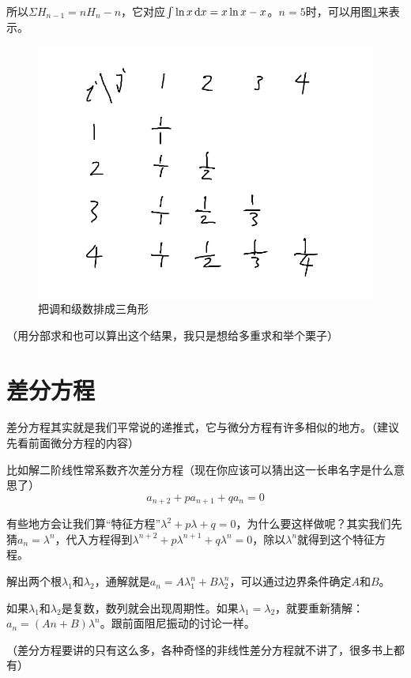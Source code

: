 所以$\Sigma H_{n-1}=n H_n-n$，它对应$\int \ln x \mathop{}\!\mathrm{d} x=x \ln x-x$。$n=5$时，可以用图\ref{fig-triangle-harmonic}来表示。
\begin{figure}[htb]
\centering
\includegraphics[scale=0.5]{fig/triangle-harmonic}
\caption{把调和级数排成三角形}
\label{fig-triangle-harmonic}
\end{figure}

（用分部求和也可以算出这个结果，我只是想给多重求和举个栗子）
\section{差分方程}
差分方程其实就是我们平常说的递推式，它与微分方程有许多相似的地方。（建议先看前面微分方程的内容）

比如解二阶线性常系数齐次差分方程（现在你应该可以猜出这一长串名字是什么意思了）
\begin{equation*}
a_{n+2}+p a_{n+1}+q a_n=0
\end{equation*}

有些地方会让我们算“特征方程”$\lambda^2+p \lambda+q=0$，为什么要这样做呢？其实我们先猜$a_n=\lambda^n$，代入方程得到$\lambda^{n+2}+p \lambda^{n+1}+q \lambda^n=0$，除以$\lambda^n$就得到这个特征方程。

解出两个根$\lambda_1$和$\lambda_2$，通解就是$a_n=A \lambda_1^n+B \lambda_2^n$，可以通过边界条件确定$A$和$B$。

如果$\lambda_1$和$\lambda_2$是复数，数列就会出现周期性。如果$\lambda_1=\lambda_2$，就要重新猜解：$a_n=(A n+B)\lambda^n$。跟前面阻尼振动的讨论一样。

（差分方程要讲的只有这么多，各种奇怪的非线性差分方程就不讲了，很多书上都有）
